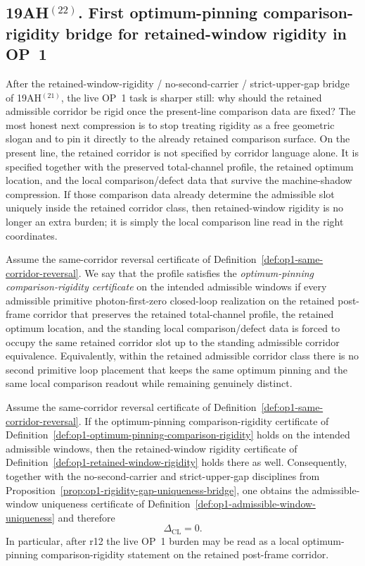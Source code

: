 \subsection*{19AH$^{(22)}$. First optimum-pinning comparison-rigidity bridge for retained-window rigidity in OP~1}
After the retained-window-rigidity / no-second-carrier / strict-upper-gap bridge of 19AH$^{(21)}$, the live OP~1 task is sharper still: why should the retained admissible corridor be rigid once the present-line comparison data are fixed? The most honest next compression is to stop treating rigidity as a free geometric slogan and to pin it directly to the already retained comparison surface. On the present line, the retained corridor is not specified by corridor language alone. It is specified together with the preserved total-channel profile, the retained optimum location, and the local comparison/defect data that survive the machine-shadow compression. If those comparison data already determine the admissible slot uniquely inside the retained corridor class, then retained-window rigidity is no longer an extra burden; it is simply the local comparison line read in the right coordinates.

\begin{definition}
\label{def:op1-optimum-pinning-comparison-rigidity}
Assume the same-corridor reversal certificate of Definition~\ref{def:op1-same-corridor-reversal}. We say that the profile satisfies the \emph{optimum-pinning comparison-rigidity certificate} on the intended admissible windows if every admissible primitive photon-first-zero closed-loop realization on the retained post-frame corridor that preserves the retained total-channel profile, the retained optimum location, and the standing local comparison/defect data is forced to occupy the same retained corridor slot up to the standing admissible corridor equivalence. Equivalently, within the retained admissible corridor class there is no second primitive loop placement that keeps the same optimum pinning and the same local comparison readout while remaining genuinely distinct.
\end{definition}

\begin{proposition}
\label{prop:op1-optimum-pinning-implies-rigidity}
Assume the same-corridor reversal certificate of Definition~\ref{def:op1-same-corridor-reversal}. If the optimum-pinning comparison-rigidity certificate of Definition~\ref{def:op1-optimum-pinning-comparison-rigidity} holds on the intended admissible windows, then the retained-window rigidity certificate of Definition~\ref{def:op1-retained-window-rigidity} holds there as well. Consequently, together with the no-second-carrier and strict-upper-gap disciplines from Proposition~\ref{prop:op1-rigidity-gap-uniqueness-bridge}, one obtains the admissible-window uniqueness certificate of Definition~\ref{def:op1-admissible-window-uniqueness} and therefore
\[
  \Delta_{\mathrm{CL}} = 0.
\]
In particular, after r12 the live OP~1 burden may be read as a local optimum-pinning comparison-rigidity statement on the retained post-frame corridor.
\end{proposition}

